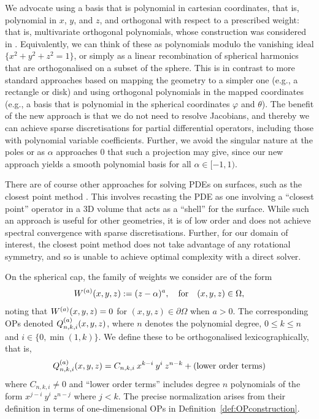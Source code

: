 \documentclass[11pt, oneside]{article}   	%
\begin{document}
We advocate using a basis that is polynomial in cartesian coordinates, that is, polynomial in $x$, $y$, and $z$, and orthogonal with respect to a prescribed weight: that is, multivariate orthogonal polynomials, whose construction was considered in \cite{olver2020orthogonal}. Equivalently, we can think of these as polynomials modulo the vanishing ideal $\{ x^2 + y^2 + z^2 = 1 \}$, or simply as a linear recombination of spherical harmonics that are orthogonalised on a subset of the sphere. This is in contrast to more standard approaches based on mapping the geometry to a simpler one (e.g., a rectangle or disk) and using orthogonal polynomials in the mapped coordinates (e.g., a basis that is polynomial in the spherical coordinates $\varphi$ and $\theta$). The benefit of the new approach is that we do not need to resolve Jacobians, and thereby we can achieve sparse discretisations for partial differential operators, including those with polynomial variable coefficients. Further, we avoid the singular nature at the poles or  as $\alpha$ approaches $0$ that such a projection may give, since our new approach yields a smooth polynomial basis for all $\alpha \in [-1,1)$. 

There are of course other approaches for solving PDEs on surfaces, such as the closest point method \cite{macdonald2010implicit, macdonald2008level}. This involves recasting the PDE as one involving a \enquote{closest point} operator in a 3D volume that acts as a \enquote{shell} for the surface. While such an approach is useful for other geometries, it is of low order and does not achieve spectral convergence with sparse discretisations. Further, for our domain of interest, the closest point method does not take advantage of any rotational symmetry, and so is unable to achieve optimal complexity with a direct solver.

On the spherical cap, the family of weights we consider are of the form
\begin{align*}
	W^{(a)}(x,y,z) := (z - \alpha)^a, \quad\hbox{for}\quad (x,y,z) \in \Omega,
\end{align*}
noting that $W^{(a)}(x,y,z) = 0$ for $(x,y,z) \in \partial \Omega$ when $a > 0$. The corresponding OPs denoted $Q_{n,k,i}^{(a)}(x,y,z)$, where $n$ denotes the polynomial degree, $0 \le k \le n$ and $i \in \{0, \min(1,k)\}$. We define these to be orthogonalised lexicographically, that is,
\begin{align*}
	Q_{n,k,i}^{(a)}(x,y,z) = C_{n,k,i} \: x^{k-i} \: y^i \: z^{n-k} + (\hbox{lower order terms})
\end{align*}
where $C_{n,k,i} \neq 0$ and \enquote{lower order terms} includes degree $n$ polynomials of the form $x^{j - i} \: y^{i} \: z^{n-j}$ where $j < k$. The precise normalization arises from their definition in terms of one-dimensional OPs in Definition~\ref{def:OPconstruction}. 
\end{document}
